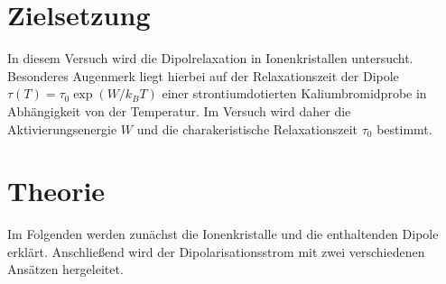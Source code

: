 \section{Zielsetzung}
\label{sec:Zielsetzung}
In diesem Versuch wird die Dipolrelaxation in Ionenkristallen untersucht. Besonderes Augenmerk liegt hierbei auf der Relaxationszeit der Dipole
$\tau(T)=\tau_0 \exp(W/k_BT)$ einer strontiumdotierten Kaliumbromidprobe in Abhängigkeit von der Temperatur.
Im Versuch wird daher die Aktivierungsenergie $W$ und die charakeristische Relaxationszeit $\tau_0$ bestimmt.

\section{Theorie}
\label{sec:Theorie}
 
Im Folgenden werden zunächst die Ionenkristalle und die enthaltenden Dipole erklärt. Anschließend wird der 
Dipolarisationsstrom mit zwei verschiedenen Ansätzen hergeleitet.

